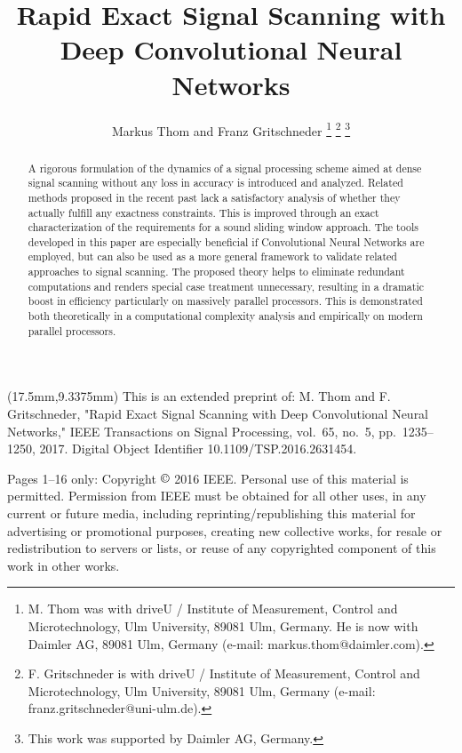 \documentclass[journal]{IEEEtran}
\begin{document}
\begin{textblock*}{170mm}(17.5mm,9.3375mm)
\parindent0mm
\normalfont\scriptsize
This is an extended preprint of:
M. Thom and F. Gritschneder,
"Rapid Exact Signal Scanning with Deep Convolutional Neural Networks,"
IEEE Transactions on Signal Processing,
vol.~65, no.~5, pp.~1235--1250, 2017.
Digital Object Identifier 10.1109/TSP.2016.2631454.

Pages 1--16 only:
Copyright $\copyright$ 2016 IEEE.
Personal use of this material is permitted.
Permission from IEEE must be obtained for all other uses, in any current or future media, including reprinting/republishing this material for advertising or promotional purposes, creating new collective works, for resale or redistribution to servers or lists, or reuse of any copyrighted component of this work in other works.
\end{textblock*}

\title{\vspace{9mm}Rapid Exact Signal Scanning with\\Deep Convolutional Neural Networks}%
\author{Markus Thom and Franz Gritschneder%
\thanks{M. Thom was with driveU / Institute of Measurement, Control and Microtechnology, Ulm University, 89081 Ulm, Germany.
He is now with Daimler AG, 89081 Ulm, Germany (e-mail: markus.thom@daimler.com).}
\thanks{F. Gritschneder is with driveU / Institute of Measurement, Control and Microtechnology, Ulm University, 89081 Ulm, Germany (e-mail: franz.gritschneder@uni-ulm.de).}
\thanks{
This work was supported by Daimler AG, Germany.}
}
\maketitle

\begin{abstract}
A rigorous formulation of the dynamics of a signal processing scheme aimed at dense signal scanning without any loss in accuracy is introduced and analyzed.
Related methods proposed in the recent past lack a satisfactory analysis of whether they actually fulfill any exactness constraints.
This is improved through an exact characterization of the requirements for a sound sliding window approach.
The tools developed in this paper are especially beneficial if Convolutional Neural Networks are employed, but can also be used as a more general framework to validate related approaches to signal scanning.
The proposed theory helps to eliminate redundant computations and renders special case treatment unnecessary, resulting in a dramatic boost in efficiency particularly on massively parallel processors.
This is demonstrated both theoretically in a computational complexity analysis and empirically on modern parallel processors.
\end{abstract}
\end{document}
